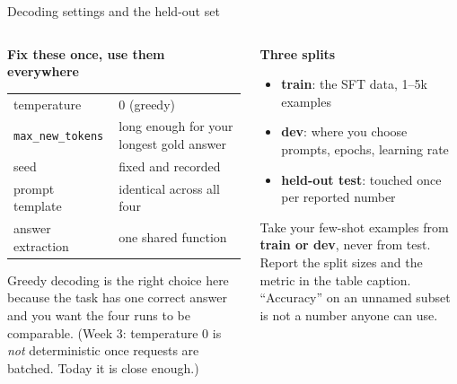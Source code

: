 \documentclass[aspectratio=169,10pt]{beamer}
\begin{document}
\begin{frame}{Decoding settings and the held-out set}
  \begin{columns}[T]
    \begin{column}{0.5\textwidth}
      \textbf{Fix these once, use them everywhere}
      \vspace{0.3em}
      \small
      \begin{tabular}{@{}L{2.8cm} L{2.4cm}@{}}
        \toprule
        temperature & 0 (greedy)\\
        \texttt{max\_new\_tokens} & long enough for your longest gold answer\\
        seed & fixed and recorded\\
        prompt template & identical across all four\\
        answer extraction & one shared function\\
        \bottomrule
      \end{tabular}
      \vspace{0.5em}

      \scriptsize Greedy decoding is the right choice here because the task has
      one correct answer and you want the four runs to be comparable.
      (Week 3: temperature 0 is \emph{not} deterministic once requests are
      batched. Today it is close enough.)
    \end{column}
    \begin{column}{0.5\textwidth}
      \textbf{Three splits}
      \begin{itemize}\small
        \item \textbf{train}: the SFT data, 1--5k examples
        \item \textbf{dev}: where you choose prompts, epochs, learning rate
        \item \textbf{held-out test}: \alert{touched once per reported number}
      \end{itemize}
      \vspace{0.5em}
      Take your few-shot examples from \textbf{train or dev}, never from test.
      \vspace{0.5em}
      \small
      Report the split sizes and the metric in the table caption. ``Accuracy''
      on an unnamed subset is not a number anyone can use.
    \end{column}
  \end{columns}
\end{frame}
\end{document}
